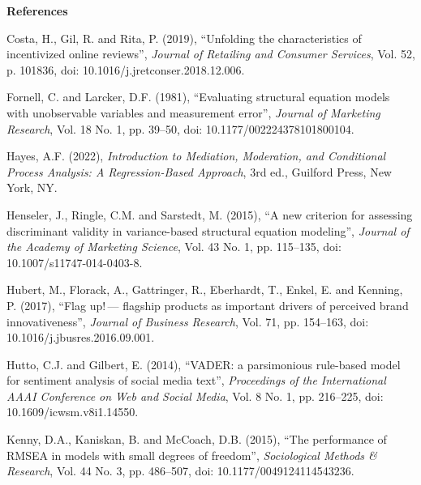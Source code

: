 \documentclass[12pt, a4paper]{article}
\newenvironment{referenceshang}{%
  \par\begingroup
  \setlength{\parindent}{0pt}%
  \setlength{\parskip}{0.5\baselineskip}%
  \everypar{\hangindent=1.5em\hangafter=1\relax}%
  \ignorespaces
}{%
  \par\endgroup
}
\begin{document}
\newpage
\noindent \textbf{References}
\begin{referenceshang}

Costa, H., Gil, R. and Rita, P. (2019), ``Unfolding the characteristics of incentivized online reviews'', \emph{Journal of Retailing and Consumer Services}, Vol. 52, p. 101836, doi: 10.1016/j.jretconser.2018.12.006.

Fornell, C. and Larcker, D.F. (1981), ``Evaluating structural equation models with unobservable variables and measurement error'', \emph{Journal of Marketing Research}, Vol. 18 No. 1, pp. 39--50, doi: 10.1177/002224378101800104.

Hayes, A.F. (2022), \emph{Introduction to Mediation, Moderation, and Conditional Process Analysis: A Regression-Based Approach}, 3rd ed., Guilford Press, New York, NY.

Henseler, J., Ringle, C.M. and Sarstedt, M. (2015), ``A new criterion for assessing discriminant validity in variance-based structural equation modeling'', \emph{Journal of the Academy of Marketing Science}, Vol. 43 No. 1, pp. 115--135, doi: 10.1007/s11747-014-0403-8.

Hubert, M., Florack, A., Gattringer, R., Eberhardt, T., Enkel, E. and Kenning, P. (2017), ``Flag up!\,--- flagship products as important drivers of perceived brand innovativeness'', \emph{Journal of Business Research}, Vol. 71, pp. 154--163, doi: 10.1016/j.jbusres.2016.09.001.

Hutto, C.J. and Gilbert, E. (2014), ``VADER: a parsimonious rule-based model for sentiment analysis of social media text'', \emph{Proceedings of the International AAAI Conference on Web and Social Media}, Vol. 8 No. 1, pp. 216--225, doi: 10.1609/icwsm.v8i1.14550.

Kenny, D.A., Kaniskan, B. and McCoach, D.B. (2015), ``The performance of RMSEA in models with small degrees of freedom'', \emph{Sociological Methods \& Research}, Vol. 44 No. 3, pp. 486--507, doi: 10.1177/0049124114543236.

\end{referenceshang}
\end{document}
